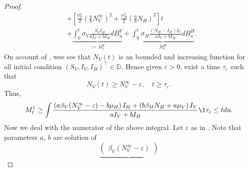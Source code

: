\begin{proof}
\begin{equation}
\begin{aligned}
                & +
                \left[
                    \frac{\sigma_V ^ 2}{2}
                    \left(
                        \frac{a}{b} N_V ^ \infty
                    \right) ^2
                    +
                    \frac{\sigma_H ^ 2}{2}
                    \left(
                        \frac{a}{b}
                        N_H
                    \right) ^ 2
                \right]
                t
                \\
                &
                +
                \underbrace{
                    \int_{0} ^ t
                        \sigma_V
                        \frac{S_V I_H}{a I_V + b I_H}
                    d B_u ^ V
                }_{:= M_t ^ V}
                +
                \underbrace{
                    \int_{0} ^ t
                        \sigma_H 
                        \frac{(N_H - I_H) I_V}{a I_V + b I_H}
                    d B_u ^ H 
                }_{M_t ^ H}.
        \end{aligned}
    \end{equation}
    On account of , wee see that $N_V(t)$ is an
    bounded and increasing function for all initial condition
    $(S_V, I_V, I_H)^ \top  \in \mathbb{D}$. Hence given $\varepsilon >0$, exist
    a time $\tau_\varepsilon$ such that
    $$
        N_V(t) \geq N_V ^ \infty 
        -
        \varepsilon, \quad t\geq \tau_\varepsilon.
    $$
    Thus,
    \begin{equation} \label{eqn:tau_bound}
        M_t ^ 1 \geq 
            \int
                \frac{
                    \left(
                        a \beta_V (N_V ^ \infty - \varepsilon) - b \mu_H
                    \right) I_H
                    +
                    \left(
                        b \beta_H N_H + a \mu_V
                    \right) I_V
                }{a I_V + bI_H}
                \1{\tau_\varepsilon \leq t}
                du .
    \end{equation}
    Now we deal with the numerator of the above integral. Let $\varepsilon$
    as in . Note that
    parameters $a$, $b$ are solution of
    \begin{equation*}
        \underbrace{
            \begin{pmatrix}
                \beta_V \left(N_V ^ {\infty} -\varepsilon\right)

\end{pmatrix}}
\end{equation*}
\end{proof}

